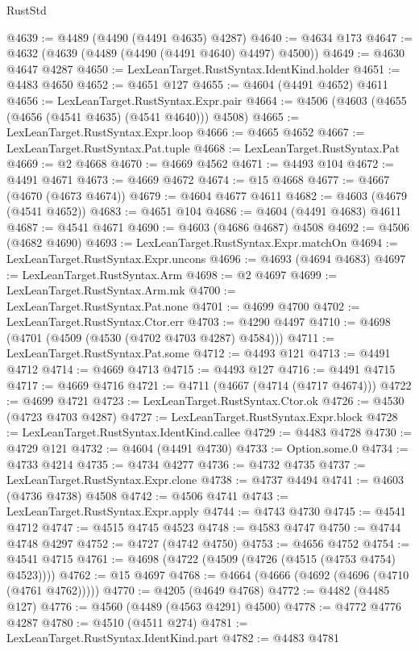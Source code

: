 \begin{lexlean}{RustStd}
\begin{coremodule}
@4639 := @4489 (@4490 (@4491 @4635) @4287)
@4640 := @4634 @173
@4647 := @4632 (@4639 (@4489 (@4490 (@4491 @4640) @4497) @4500))
@4649 := @4630 @4647 @4287
@4650 := LexLeanTarget.RustSyntax.IdentKind.holder
@4651 := @4483 @4650
@4652 := @4651 @127
@4655 := @4604 (@4491 @4652) @4611
@4656 := LexLeanTarget.RustSyntax.Expr.pair
@4664 := @4506 (@4603 (@4655 (@4656 (@4541 @4635) (@4541 @4640))) @4508)
@4665 := LexLeanTarget.RustSyntax.Expr.loop
@4666 := @4665 @4652
@4667 := LexLeanTarget.RustSyntax.Pat.tuple
@4668 := LexLeanTarget.RustSyntax.Pat
@4669 := @2 @4668
@4670 := @4669 @4562
@4671 := @4493 @104
@4672 := @4491 @4671
@4673 := @4669 @4672
@4674 := @15 @4668
@4677 := @4667 (@4670 (@4673 @4674))
@4679 := @4604 @4677 @4611
@4682 := @4603 (@4679 (@4541 @4652))
@4683 := @4651 @104
@4686 := @4604 (@4491 @4683) @4611
@4687 := @4541 @4671
@4690 := @4603 (@4686 @4687) @4508
@4692 := @4506 (@4682 @4690)
@4693 := LexLeanTarget.RustSyntax.Expr.matchOn
@4694 := LexLeanTarget.RustSyntax.Expr.uncons
@4696 := @4693 (@4694 @4683)
@4697 := LexLeanTarget.RustSyntax.Arm
@4698 := @2 @4697
@4699 := LexLeanTarget.RustSyntax.Arm.mk
@4700 := LexLeanTarget.RustSyntax.Pat.none
@4701 := @4699 @4700
@4702 := LexLeanTarget.RustSyntax.Ctor.err
@4703 := @4290 @4497
@4710 := @4698 (@4701 (@4509 (@4530 (@4702 @4703 @4287) @4584)))
@4711 := LexLeanTarget.RustSyntax.Pat.some
@4712 := @4493 @121
@4713 := @4491 @4712
@4714 := @4669 @4713
@4715 := @4493 @127
@4716 := @4491 @4715
@4717 := @4669 @4716
@4721 := @4711 (@4667 (@4714 (@4717 @4674)))
@4722 := @4699 @4721
@4723 := LexLeanTarget.RustSyntax.Ctor.ok
@4726 := @4530 (@4723 @4703 @4287)
@4727 := LexLeanTarget.RustSyntax.Expr.block
@4728 := LexLeanTarget.RustSyntax.IdentKind.callee
@4729 := @4483 @4728
@4730 := @4729 @121
@4732 := @4604 (@4491 @4730)
@4733 := Option.some.{0}
@4734 := @4733 @4214
@4735 := @4734 @4277
@4736 := @4732 @4735
@4737 := LexLeanTarget.RustSyntax.Expr.clone
@4738 := @4737 @4494
@4741 := @4603 (@4736 @4738) @4508
@4742 := @4506 @4741
@4743 := LexLeanTarget.RustSyntax.Expr.apply
@4744 := @4743 @4730
@4745 := @4541 @4712
@4747 := @4515 @4745 @4523
@4748 := @4583 @4747
@4750 := @4744 @4748 @4297
@4752 := @4727 (@4742 @4750)
@4753 := @4656 @4752
@4754 := @4541 @4715
@4761 := @4698 (@4722 (@4509 (@4726 (@4515 (@4753 @4754) @4523))))
@4762 := @15 @4697
@4768 := @4664 (@4666 (@4692 (@4696 (@4710 (@4761 @4762)))))
@4770 := @4205 (@4649 @4768)
@4772 := @4482 (@4485 @127)
@4776 := @4560 (@4489 (@4563 @4291) @4500)
@4778 := @4772 @4776 @4287
@4780 := @4510 (@4511 @274)
@4781 := LexLeanTarget.RustSyntax.IdentKind.part
@4782 := @4483 @4781

\end{coremodule}
\end{lexlean}

